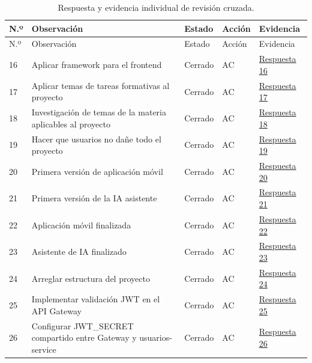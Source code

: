 \documentclass[12pt,a4paper]{article}
\begin{document}
{\small\begin{longtable}{p{0.6cm}p{6.8cm}p{1.7cm}p{1.1cm}p{2.8cm}}
\caption{Respuesta y evidencia individual de revisión cruzada.}\label{tab:issues}\\
\toprule N.º & Observación & Estado & Acción & Evidencia\\\midrule\endfirsthead
\toprule N.º & Observación & Estado & Acción & Evidencia\\\midrule\endhead
16 & Aplicar framework para el frontend & Cerrado & AC & \href{https://github.com/JoseLozanoMorales/TiendaTech/issues/16#issuecomment-5499536102}{Respuesta 16} \\
17 & Aplicar temas de tareas formativas al proyecto & Cerrado & AC & \href{https://github.com/JoseLozanoMorales/TiendaTech/issues/17#issuecomment-5499878376}{Respuesta 17} \\
18 & Investigación de temas de la materia aplicables al proyecto & Cerrado & AC & \href{https://github.com/JoseLozanoMorales/TiendaTech/issues/18#issuecomment-5499810621}{Respuesta 18} \\
19 & Hacer que usuarios no dañe todo el proyecto & Cerrado & AC & \href{https://github.com/JoseLozanoMorales/TiendaTech/issues/19#issuecomment-5499881456}{Respuesta 19} \\
20 & Primera versión de aplicación móvil & Cerrado & AC & \href{https://github.com/JoseLozanoMorales/TiendaTech/issues/20#issuecomment-5499700698}{Respuesta 20} \\
21 & Primera versión de la IA asistente & Cerrado & AC & \href{https://github.com/JoseLozanoMorales/TiendaTech/issues/21#issuecomment-5499702639}{Respuesta 21} \\
22 & Aplicación móvil finalizada & Cerrado & AC & \href{https://github.com/JoseLozanoMorales/TiendaTech/issues/22#issuecomment-5499884436}{Respuesta 22} \\
23 & Asistente de IA finalizado & Cerrado & AC & \href{https://github.com/JoseLozanoMorales/TiendaTech/issues/23#issuecomment-5499887488}{Respuesta 23} \\
24 & Arreglar estructura del proyecto & Cerrado & AC & \href{https://github.com/JoseLozanoMorales/TiendaTech/issues/24#issuecomment-5499806741}{Respuesta 24} \\
25 & Implementar validación JWT en el API Gateway & Cerrado & AC & \href{https://github.com/JoseLozanoMorales/TiendaTech/issues/25#issuecomment-5499444070}{Respuesta 25} \\
26 & Configurar JWT\_SECRET compartido entre Gateway y usuarios-service & Cerrado & AC & \href{https://github.com/JoseLozanoMorales/TiendaTech/issues/26#issuecomment-5499490631}{Respuesta 26} \\

\end{longtable}}
\end{document}
